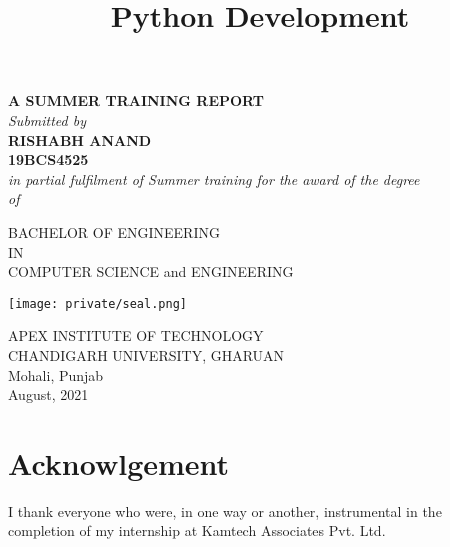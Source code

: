 \documentclass[14pt]{extarticle}
\title{Python Development}
\author{}
\date{}
\newcommand\frontmatter{
    \cleardoublepage
    \pagenumbering{roman}
}
\begin{document}
\frontmatter

\maketitle

\vspace{-5em}

\begin{center}
    \singlespacing
\textbf {A SUMMER TRAINING REPORT} \\ 
\emph {Submitted by} \\ 
\textbf {RISHABH ANAND} \\
\textbf {19BCS4525 }   \\

\vspace{1cm}
\onehalfspacing
\emph {in partial fulfilment of Summer training for the award of the degree} \\ 
\emph {of} \\ 

\vspace{1.5cm}
\singlespacing

BACHELOR OF ENGINEERING \\
IN \\
COMPUTER SCIENCE and ENGINEERING\\

\vspace{1cm}

\texttt{[image: private/seal.png]}

\vspace{1cm}
\singlespacing

APEX INSTITUTE OF TECHNOLOGY\\
CHANDIGARH UNIVERSITY, GHARUAN\\
Mohali, Punjab \\

\onehalfspacing
August, 2021

\end{center}
\restoregeometry

\newpage
{}


\newpage
{}
\section*{Acknowlgement}
\par I thank everyone who were, in one way or another, instrumental in the completion of my internship at Kamtech Associates Pvt. Ltd.
\end{document}
